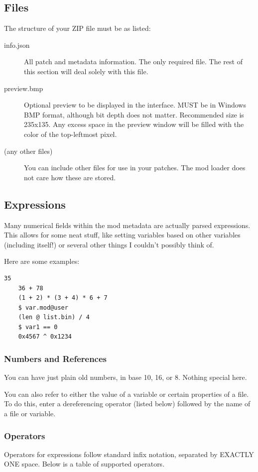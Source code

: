\documentclass[12pt,a4paper,notitlepage]{article}
\begin{document}
\subsection{Files}
\label{subsec:create-files}
The structure of your ZIP file must be as listed:
\begin{description}
\item[info.json] All patch and metadata information. The only required file. The rest of this section will deal solely with this file.
\item[preview.bmp] Optional preview to be displayed in the interface. MUST be in Windows BMP format, although bit depth does not matter. Recommended size is 235x135. Any excess space in the preview window will be filled with the color of the top-leftmost pixel.
\item[(any other files)] You can include other files for use in your patches. The mod loader does not care how these are stored.
\end{description}

\subsection{Expressions}
\label{subsec:create-expr}
Many numerical fields within the mod metadata are actually parsed expressions. This allows for some neat stuff, like setting variables based on other variables (including itself!) or several other things I couldn't possibly think of.

Here are some examples:
\begin{lstlisting}[breaklines=true]
    35
    36 + 78
    (1 + 2) * (3 + 4) * 6 + 7
    $ var.mod@user
    (len @ list.bin) / 4
    $ var1 == 0
    0x4567 ^ 0x1234
\end{lstlisting}

\subsubsection{Numbers and References}
You can have just plain old numbers, in base 10, 16, or 8. Nothing special here.

You can also refer to either the value of a variable or certain properties of a file. To do this, enter a dereferencing operator (listed below) followed by the name of a file or variable.

\subsubsection{Operators}
Operators for expressions follow standard infix notation, separated by EXACTLY ONE space. Below is a table of supported operators.
\end{document}
